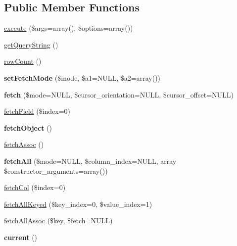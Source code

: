 \subsection*{Public Member Functions}
\begin{DoxyCompactItemize}
\item 
\hyperlink{classDatabaseStatementEmpty_a01d549f8173db0919ba199cb4e8d92a9}{execute} (\$args=array(), \$options=array())
\item 
\hyperlink{classDatabaseStatementEmpty_a14114ed9aed78af3b2ff03eb40840e7d}{getQueryString} ()
\item 
\hyperlink{classDatabaseStatementEmpty_aba97790d259fd594defbd52ff9f1037d}{rowCount} ()
\item 
\hypertarget{classDatabaseStatementEmpty_a4deaaf27d70cd50ce96e2ad85b5641bc}{
{\bfseries setFetchMode} (\$mode, \$a1=NULL, \$a2=array())}
\label{classDatabaseStatementEmpty_a4deaaf27d70cd50ce96e2ad85b5641bc}

\item 
\hypertarget{classDatabaseStatementEmpty_ac692f1b4621399596a0ce3bb4e2e17fb}{
{\bfseries fetch} (\$mode=NULL, \$cursor\_\-orientation=NULL, \$cursor\_\-offset=NULL)}
\label{classDatabaseStatementEmpty_ac692f1b4621399596a0ce3bb4e2e17fb}

\item 
\hyperlink{classDatabaseStatementEmpty_a0cadfb54ef7906aaaf57d7278ab6bb27}{fetchField} (\$index=0)
\item 
\hypertarget{classDatabaseStatementEmpty_a2250d20e4854cc2343d3ca4f79e218b7}{
{\bfseries fetchObject} ()}
\label{classDatabaseStatementEmpty_a2250d20e4854cc2343d3ca4f79e218b7}

\item 
\hyperlink{classDatabaseStatementEmpty_a4e3f452f86f9be6c96db961d0e734a37}{fetchAssoc} ()
\item 
\hypertarget{classDatabaseStatementEmpty_a08b5526a29f47725bc3f900c8bb9523e}{
{\bfseries fetchAll} (\$mode=NULL, \$column\_\-index=NULL, array \$constructor\_\-arguments=array())}
\label{classDatabaseStatementEmpty_a08b5526a29f47725bc3f900c8bb9523e}

\item 
\hyperlink{classDatabaseStatementEmpty_a51d1a6428d3357315eab407864c08826}{fetchCol} (\$index=0)
\item 
\hyperlink{classDatabaseStatementEmpty_ab0bfa3541bdfb1f7003f15363911c99f}{fetchAllKeyed} (\$key\_\-index=0, \$value\_\-index=1)
\item 
\hyperlink{classDatabaseStatementEmpty_a7715d753726ebd0b6c292faabfc4ed90}{fetchAllAssoc} (\$key, \$fetch=NULL)
\item 
\hypertarget{classDatabaseStatementEmpty_ad758070598b28d6f302c0557f4e85d40}{
{\bfseries current} ()}
\label{classDatabaseStatementEmpty_ad758070598b28d6f302c0557f4e85d40}


\end{DoxyCompactItemize}
